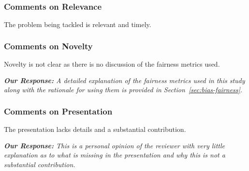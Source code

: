 \documentclass[conference,review,anonymous]{IEEEtran}
\newcommand{\highlight}[1]{\begin{framed}%
  \noindent\emph{#1}
\end{framed}}
\begin{document}
\subsubsection{Comments on Relevance}
The problem being tackled is relevant and timely.

\subsubsection{Comments on Novelty}
Novelty is not clear as there is no discussion of the fairness metrics
used.

\highlight{\emph{\textbf{Our Response:}} A detailed explanation of the
fairness metrics used in this study along with the rationale for using
them is provided in Section~\ref{sec:bias-fairness}.}

\subsubsection{Comments on Presentation}
The presentation lacks details and a substantial contribution.

\highlight{\emph{\textbf{Our Response:}} This is a personal opinion of
the reviewer with very little explanation as to what is missing in the
presentation and why this is not a substantial contribution.}
\end{document}
